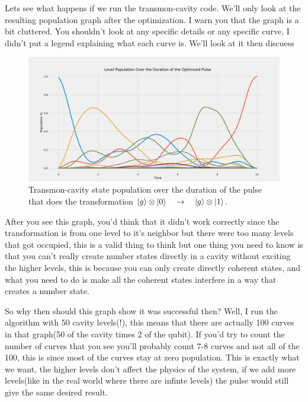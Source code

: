 \documentclass[english, a4paper, 12pt, twoside]{article}
\numberwithin{equation}{section} %
\begin{document}
Lets see what happens if we run the transmon-cavity code. We'll only look at the resulting population graph after the optimization. I warn you that the graph is a bit cluttered. You shouldn't look at any specific details or any specific curve, I didn't put a legend explaining what each curve is. We'll look at it then discuess
\begin{figure}[H] %
    \centering
    \includegraphics[width=1\columnwidth]{Results/transmon-cavity/g0-g1-level-population.png}
    \caption{Transmon-cavity state population over the duration of the pulse that does the transformation $\ket{g} \otimes \ket{0} \quad \rightarrow \quad \ket{g} \otimes \ket{1}$.}
    \label{fig:transmon-cavity-population}
\end{figure}
After you see this graph, you'd think that it didn't work correctly since the transformation is from one level to it's neighbor but there were too many levels that got occupied, this is a valid thing to think but one thing you need to know is that you can't really create number states directly in a cavity without exciting the higher levels, this is because you can only create directly coherent states, and what you need to do is make all the coherent states interfere in a way that creates a number state.

So why then should this graph show it was successful then? Well, I run the algorithm with 50 cavity levels(!), this means that there are actually 100 curves in that graph(50 of the cavity times 2 of the qubit). If you'd try to count the number of curves that you see you'll probably count 7-8 curves and not all of the 100, this is since most of the curves stay at zero population. This is exactly what we want, the higher levels don't affect the physics of the system, if we add more levels(like in the real world where there are infinte levels) the pulse would still give the same desired result.
\end{document}
